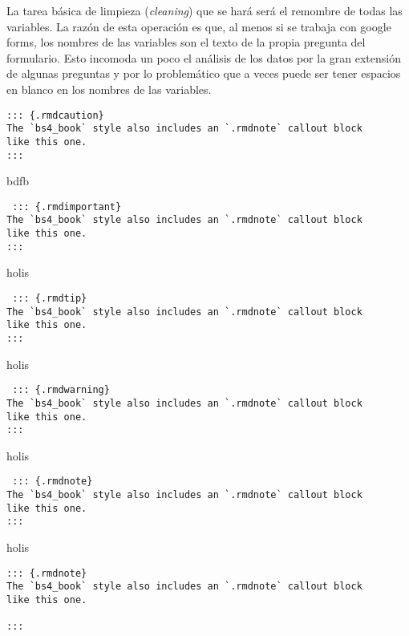 \documentclass[
]{book}
\theoremstyle{definition}
\theoremstyle{definition}
\theoremstyle{definition}
\theoremstyle{definition}
\theoremstyle{remark}
\begin{document}
La tarea básica de limpieza (\emph{cleaning}) que se hará será el remombre de todas las variables. La razón de esta operación es que, al menos si se trabaja con google forms, los nombres de las variables son el texto de la propia pregunta del formulario. Esto incomoda un poco el análisis de los datos por la gran extensión de algunas preguntas y por lo problemático que a veces puede ser tener espacios en blanco en los nombres de las variables.

\begin{verbatim}
::: {.rmdcaution}
The `bs4_book` style also includes an `.rmdnote` callout block
like this one.
:::
\end{verbatim}

bdfb

\begin{verbatim}
 ::: {.rmdimportant}
The `bs4_book` style also includes an `.rmdnote` callout block
like this one.
:::
\end{verbatim}

holis

\begin{verbatim}
 ::: {.rmdtip}
The `bs4_book` style also includes an `.rmdnote` callout block
like this one.
:::
\end{verbatim}

holis

\begin{verbatim}
 ::: {.rmdwarning}
The `bs4_book` style also includes an `.rmdnote` callout block
like this one.
:::
\end{verbatim}

holis

\begin{verbatim}
 ::: {.rmdnote}
The `bs4_book` style also includes an `.rmdnote` callout block
like this one.
:::
\end{verbatim}

holis

\begin{verbatim}
::: {.rmdnote}
The `bs4_book` style also includes an `.rmdnote` callout block
like this one.

:::
\end{verbatim}
\end{document}

